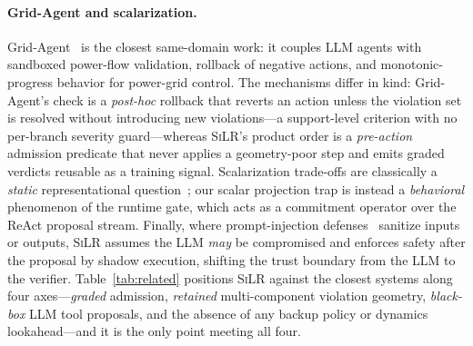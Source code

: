 \documentclass[letterpaper]{article} %
\theoremstyle{plain}
\newcommand{\silr}{\textsc{SiLR}}
\begin{document}
\paragraph{Grid-Agent and scalarization.}
Grid-Agent~\citep{gridagent2025} is the closest same-domain work: it couples LLM agents with sandboxed power-flow validation, rollback of negative actions, and monotonic-progress behavior for power-grid control. The mechanisms differ in kind: Grid-Agent's check is a \emph{post-hoc} rollback that reverts an action unless the violation set is resolved without introducing new violations---a support-level criterion with no per-branch severity guard---whereas \silr{}'s product order is a \emph{pre-action} admission predicate that never applies a geometry-poor step and emits graded verdicts reusable as a training signal. Scalarization trade-offs are classically a \emph{static} representational question~\citep{miettinen1999nonlinear}; our scalar projection trap is instead a \emph{behavioral} phenomenon of the runtime gate, which acts as a commitment operator over the ReAct proposal stream. Finally, where prompt-injection defenses~\citep{greshake2023injection} sanitize inputs or outputs, \silr{} assumes the LLM \emph{may} be compromised and enforces safety after the proposal by shadow execution, shifting the trust boundary from the LLM to the verifier. Table~\ref{tab:related} positions \silr{} against the closest systems along four axes---\emph{graded} admission, \emph{retained} multi-component violation geometry, \emph{black-box} LLM tool proposals, and the absence of any backup policy or dynamics lookahead---and it is the only point meeting all four.
\end{document}

